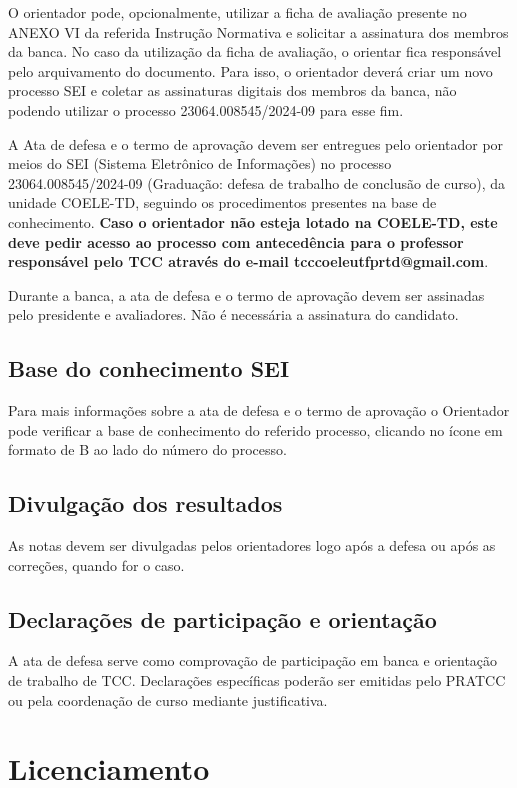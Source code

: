 \documentclass[a4paper, 12pt]{article}
\newcommand{\seiprocess}{23064.008545/2024-09} %
\begin{document}
	O orientador pode, opcionalmente, utilizar a ficha de avaliação presente no ANEXO VI da referida Instrução Normativa e solicitar a assinatura dos membros da banca. No caso da utilização da ficha de avaliação, o orientar fica responsável pelo arquivamento do documento. Para isso, o orientador deverá criar um novo processo SEI e coletar as assinaturas digitais dos membros da banca, não podendo utilizar o processo \seiprocess{} para esse fim.
 	
	A Ata de defesa e o termo de aprovação devem ser entregues pelo orientador por meios do SEI (Sistema Eletrônico de Informações) no processo \seiprocess{} (Graduação: defesa de trabalho de conclusão de curso), da unidade COELE-TD, seguindo os procedimentos presentes na base de conhecimento. \textbf{Caso o orientador não esteja lotado na COELE-TD, este deve pedir acesso ao processo com antecedência para o professor responsável pelo TCC através do e-mail tcccoeleutfprtd@gmail.com}.

	Durante a banca, a ata de defesa e o termo de aprovação devem ser assinadas pelo presidente e avaliadores. Não é necessária a assinatura do candidato. 
	
	\subsection{Base do conhecimento SEI}
	
	Para mais informações sobre a ata de defesa e o termo de aprovação o Orientador pode verificar a base de conhecimento do referido processo, clicando no ícone em formato de B ao lado do número do processo.
	
	\subsection{Divulgação dos resultados}
	
	As notas devem ser divulgadas pelos orientadores logo após a defesa ou após as correções, quando for o caso.

	\subsection{Declarações de participação e orientação}

	A ata de defesa serve como comprovação de participação em banca e orientação de trabalho de TCC. Declarações específicas poderão ser emitidas pelo PRATCC ou pela coordenação de curso mediante justificativa.
	
	\section{Licenciamento}
	
\end{document}
